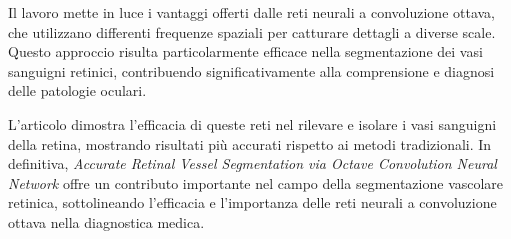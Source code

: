 Il lavoro mette in luce i vantaggi offerti dalle reti neurali a convoluzione ottava, che utilizzano
differenti frequenze spaziali per catturare dettagli a diverse scale. Questo approccio risulta
particolarmente efficace nella segmentazione dei vasi sanguigni retinici, contribuendo
significativamente alla comprensione e diagnosi delle patologie oculari.

L'articolo dimostra l'efficacia di queste reti nel rilevare e isolare i vasi sanguigni della retina,
mostrando risultati più accurati rispetto ai metodi tradizionali. In definitiva, \textit{Accurate
	Retinal Vessel Segmentation via Octave Convolution Neural Network} offre un contributo importante
nel campo della segmentazione vascolare retinica, sottolineando l'efficacia e l'importanza delle
reti neurali a convoluzione ottava nella diagnostica medica.
